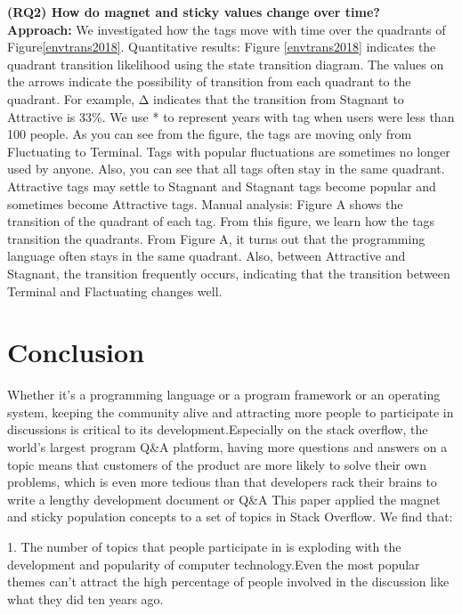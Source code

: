 \documentclass[conference]{IEEEtran}
\begin{document}
\textbf{(RQ2) How do magnet and sticky values change over time?} \\
\textbf{Approach:}
We investigated how the tags move with time over the quadrants of Figure\ref{envtrans2018}. 
Quantitative results:
Figure \ref{envtrans2018} indicates the quadrant transition likelihood using the state transition diagram. The values on the arrows indicate the possibility of transition from each quadrant to the quadrant. For example, Δ indicates that the transition from Stagnant to Attractive is 33\%. We use * to represent years with tag when users were less than 100 people.
As you can see from the figure, the tags are moving only from Fluctuating to Terminal. Tags with popular fluctuations are sometimes no longer used by anyone. Also, you can see that all tags often stay in the same quadrant. Attractive tags may settle to Stagnant and Stagnant tags become popular and sometimes become Attractive tags. Manual analysis:
Figure A shows the transition of the quadrant of each tag. From this figure, we learn how the tags transition the quadrants.
From Figure A, it turns out that the programming language often stays in the same quadrant. Also, between Attractive and Stagnant, the transition frequently occurs, indicating that the transition between Terminal and Flactuating changes well.





\section{Conclusion}

Whether it's a programming language or a program framework or an operating system, keeping the community alive and attracting more people to participate in discussions is critical to its development.Especially on the stack overflow, the world's largest program Q\&A platform, having more questions and answers on a topic means that customers of the product are more likely to solve their own problems, which is even more tedious than that developers rack their brains to write a lengthy development document or Q\&A This paper applied the magnet and sticky population concepts to a set of topics in Stack Overflow. We find that:

1. The number of topics that people participate in is exploding with the development and popularity of computer technology.Even the most popular themes can't attract the high percentage of people involved in the discussion like what they did ten years ago.\\
\end{document}
